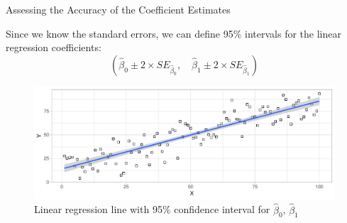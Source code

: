 \begin{frame}{Assessing the Accuracy of the Coefficient Estimates}

    Since we know the standard errors, we can define 95\% intervals for the linear regression coefficients:
    \begin{equation*}
    \left( \hat{\beta}_0 \pm 2 \times SE_{\hat{\beta}_0}, \quad \hat{\beta}_1 \pm 2 \times SE_{\hat{\beta}_1} \right)
    \end{equation*} 

    \begin{figure}
        \centering
        \includegraphics[width=\linewidth]{R/plots/linear_regression_SE}
        Linear regression line with 95\% confidence interval for $\hat{\beta}_0$, $\hat{\beta}_1$
    \end{figure}

\end{frame}

